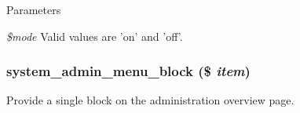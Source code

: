 \begin{DoxyParams}{Parameters}
\item[{\em \$mode}]Valid values are 'on' and 'off'. \end{DoxyParams}
\hypertarget{system_8module_aefe1548b98360e16fcdf579045d5c303}{
\subsubsection[{system\_\-admin\_\-menu\_\-block}]{\setlength{\rightskip}{0pt plus 5cm}system\_\-admin\_\-menu\_\-block (\$ {\em item})}}
\label{system_8module_aefe1548b98360e16fcdf579045d5c303}
Provide a single block on the administration overview page.


